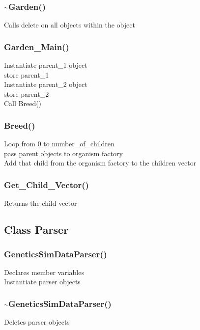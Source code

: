 \documentclass{article}
\begin{document}
\subsubsection{\textasciitilde Garden()}
\indent Calls delete on all objects within the object

\subsubsection{Garden\_Main()}
\indent Instantiate parent\_1 object\\
\indent store parent\_1\\
\indent Instantiate parent\_2 object\\
\indent store parent\_2\\
\indent Call Breed()\\

\subsubsection{Breed()}
\indent Loop from 0 to number\_of\_children\\
\indent\indent pass parent objects to organism factory\\
\indent\indent Add that child from the organism factory to the children vector\\

\subsubsection{Get\_Child\_Vector()}
\indent Returns the child vector

\newpage

\subsection{Class Parser}
\subsubsection{GeneticsSimDataParser()}
\indent Declares member variables\\
\indent Instantiate parser objects\\

\subsubsection{\textasciitilde GeneticsSimDataParser()}
\indent Deletes parser objects\\
\end{document}
